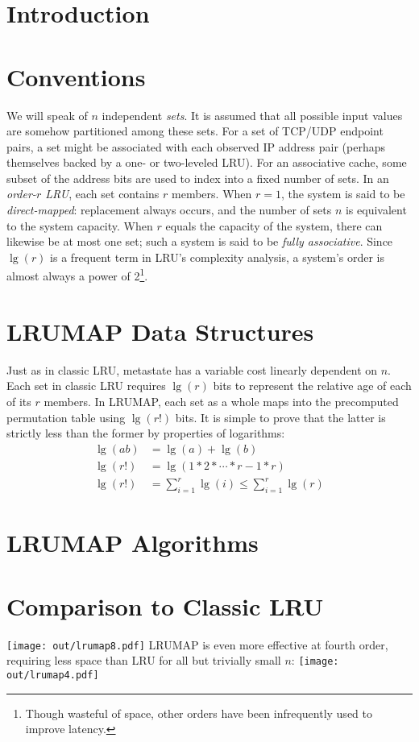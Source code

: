 \documentclass[letterpaper,10pt]{article}
\makeatletter
\newenvironment{figurehere}
{\def\@captype{figure}}
{}
\makeatother
\begin{document}
\begin{multicols}{2}
\section{Introduction}
\cite{varghese}
\cite{xu}

\section{Conventions}
We will speak of $n$ independent \textit{sets}. It is assumed that all possible
input values are somehow partitioned among these sets. For a set of TCP/UDP
endpoint pairs, a set might be associated with each observed IP address pair
(perhaps themselves backed by a one- or two-leveled LRU). For an associative
cache, some subset of the address bits are used to index into a fixed number of
sets. In an \textit{order-$r$ LRU}, each set contains $r$ members. When $r=1$,
the system is said to be \textit{direct-mapped}: replacement always occurs, and
the number of sets $n$ is equivalent to the system capacity. When $r$ equals
the capacity of the system, there can likewise be at most one set; such a system
is said to be \textit{fully associative}. Since $\lg{(r)}$ is a frequent term in
LRU's complexity analysis, a system's order is almost always a power of 2\footnote{Though
wasteful of space, other orders have been infrequently used to improve latency\cite{intelcpuid}.}.
\section{LRUMAP Data Structures}
Just as in classic LRU, metastate has a variable cost linearly dependent on $n$.
Each set in classic LRU requires $\lg{(r)}$ bits to represent the relative age
of each of its $r$ members. In LRUMAP, each set as a whole maps into the
precomputed permutation table using $\lg{(r!)}$ bits. It is simple to prove that
the latter is strictly less than the former by properties of logarithms:
\begin{align*}
\lg{(ab)} &= \lg{(a)} + \lg{(b)} \\
\lg{(r!)} &= \lg{(1*2*\dotsb*r-1*r)} \\
\lg{(r!)} &= \sum_{i=1}^{r}{\lg{(i)}} \le \sum_{i=1}^{r}{\lg{(r)}}
\end{align*}
\section{LRUMAP Algorithms}
\section{Comparison to Classic LRU}
\begin{figurehere}
	\centering
	\texttt{[image: out/lrumap8.pdf]}
\end{figurehere}
LRUMAP is even more effective at fourth order, requiring less space than LRU
for all but trivially small $n$:
\begin{figurehere}
	\centering
	\texttt{[image: out/lrumap4.pdf]}
\end{figurehere}

\end{multicols}
\end{document}
